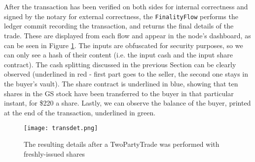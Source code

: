 \documentclass[12pt,twoside]{article}
\begin{document}
\\ \\
After the transaction has been verified on both sides for internal correctness and signed by the notary for external correctness, the \verb|FinalityFlow| performs the ledger commit recording the transaction, and returns the final details of the trade. These are displayed from each flow and appear in the node's dashboard, as can be seen in Figure \ref{fig:transactionDetails}. The inputs are obfuscated for security purposes, so we can only see a hash of their content (i.e. the input cash and the input share contract). The cash splitting discussed in the previous Section can be clearly observed (underlined in red - first part goes to the seller, the second one stays in the buyer's vault). The share contract is underlined in blue, showing that ten shares in the GS stock have been transferred to the buyer in that particular instant, for \$220 a share. Lastly, we can observe the balance of the buyer, printed at the end of the transaction, underlined in green. 
\begin{figure}[!htb]
\centering
\texttt{[image: transdet.png]}
\caption{The resulting details after a TwoPartyTrade was performed with freshly-issued shares}
\centering
\label{fig:transactionDetails}
\end{figure}
\end{document}
